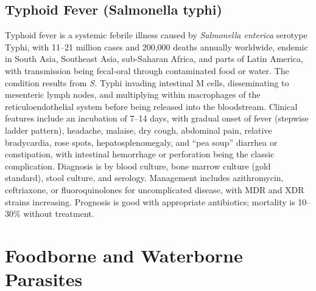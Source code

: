 \subsection{Typhoid Fever (Salmonella typhi)}
\label{sec:Typhoid Fever}
Typhoid fever is a systemic febrile illness caused by \textit{Salmonella enterica} serotype Typhi, with 11--21 million cases and 200,000 deaths annually worldwide, endemic in South Asia, Southeast Asia, sub-Saharan Africa, and parts of Latin America, with transmission being fecal-oral through contaminated food or water. The condition results from \textit{S.} Typhi invading intestinal M cells, disseminating to mesenteric lymph nodes, and multiplying within macrophages of the reticuloendothelial system before being released into the bloodstream. Clinical features include an incubation of 7--14 days, with gradual onset of fever (stepwise ladder pattern), headache, malaise, dry cough, abdominal pain, relative bradycardia, rose spots, hepatosplenomegaly, and ``pea soup'' diarrhea or constipation, with intestinal hemorrhage or perforation being the classic complication. Diagnosis is by blood culture, bone marrow culture (gold standard), stool culture, and serology. Management includes azithromycin, ceftriaxone, or fluoroquinolones for uncomplicated disease, with MDR and XDR strains increasing. Prognosis is good with appropriate antibiotics; mortality is 10--30\% without treatment.

\section{Foodborne and Waterborne Parasites}








